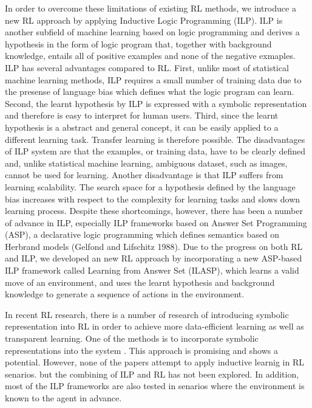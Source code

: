 In order to overcome these limitations of existing RL methods, we introduce a new RL approach by applying Inductive Logic Programming (ILP). 
ILP is another subfield of machine learning based on logic programming and derives a hypothesis in the form of logic program that, together with background knowledge, entails all of positive examples and none of the negative exmaples. 
ILP has several advantages compared to RL. 
First, unlike most of statistical machine learning methods, ILP requires a small number of training data due to the presense of language bias which defines what the logic program can learn.
Second, the learnt hypothesis by ILP is expressed with a symbolic representation and therefore is easy to interpret for human users.
Third, since the learnt hypothesis is a abstract and general concept, it can be easily applied to a different learning task. 
Transfer learning is therefore possible.
The disadvantages of ILP system are that the examples, or training data, have to be clearly defined and, unlike statistical machine learning, ambiguous dataset, such as images, cannot be used for learning.
Another disadvantage is that ILP suffers from learning scalability. The search space for a hypothesis defined by the language bias increases with respect to the complexity for learning tasks and slows down learning process.
Despite these shortcomings, however, there has been a number of advance in ILP, especially ILP frameworks based on Answer Set Programming (ASP), a declarative logic programming which defines semantics based on Herbrand models (Gelfond and Lifschitz 1988).
Due to the progress on both RL and ILP, we developed an new RL approach by incorporating a new ASP-based ILP framework called Learning from Answer Set (ILASP), which learns a valid move of an environment, 
and uses the learnt hypothesis and background knowledge to generate a sequence of actions in the environment. 

In recent RL research, there is a number of research of introducing symbolic representation into RL in order to achieve more data-efficient learning as well as transparent learning. 
One of the methods is to incorporate symbolic representations into the system \cite{Garnelo2016}. This approach is promising and shows a potential.
However, none of the papers attempt to apply inductive learnig in RL senarios. 
but the combining of ILP and RL has not been explored.
In addition, most of the ILP frameworks are also tested in senarios where the environment is known to the agent in advance.

